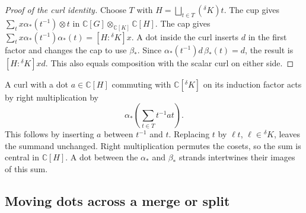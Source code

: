 \documentclass[11pt,a4paper]{article}
\numberwithin{equation}{section}
\theoremstyle{definition}
\newcommand{\C}{\mathbb C}
\newcommand{\cg}[2]{{}^{#1}\!#2}
\begin{document}
\begin{center}
\begin{minipage}{.98\linewidth}
\centering
{}
\end{minipage}
\end{center}

\begin{proof}[Proof of the curl identity]
Choose \(T\) with \(H=\bigsqcup_{t\in T}(\cg{\delta}{K})t\).
The cup gives \(\sum_t x\alpha_*(t^{-1})\otimes t\) in
\(\C[G]\otimes_{\C[K]}\C[H]\). The cap gives
\(\sum_t x\alpha_*(t^{-1})\alpha_*(t)=[H:\cg{\delta}{K}]x\).
A dot inside the curl inserts \(d\) in the first factor and changes
the cap to use \(\beta_*\). Since
\(\alpha_*(t^{-1})d\,\beta_*(t)=d\), the result is
\([H:\cg{\delta}{K}]xd\). This also equals composition with the
scalar curl on either side.
\end{proof}

A curl with a dot \(a\in \C[H]\) commuting with \(\C[\cg{\delta}{K}]\)
on its induction factor acts by right multiplication by
\[
 \alpha_*\!\left(\sum_{t\in T}t^{-1}at\right).
\]
This follows by inserting \(a\) between \(t^{-1}\) and \(t\).
Replacing \(t\) by \(\ell t\), \(\ell\in\cg{\delta}{K}\), leaves
the summand unchanged. Right multiplication permutes the cosets,
so the sum is central in \(\C[H]\). A dot between the \(\alpha_*\)
and \(\beta_*\) strands intertwines their images of this sum.

\subsection{Moving dots across a merge or split}
\end{document}
